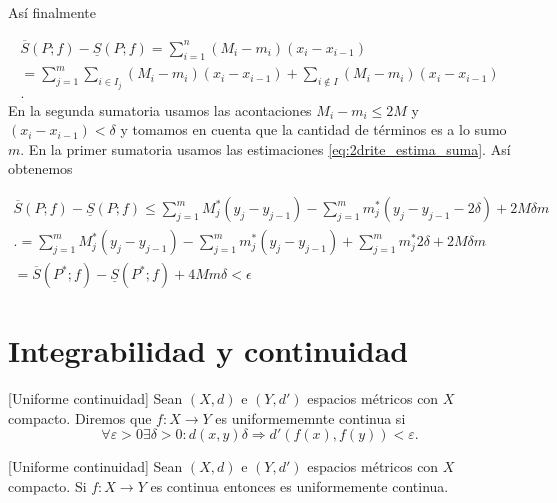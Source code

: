 \begin{demo}
Así finalmente

\begin{multline*}\label{eq:crite2_cuentas}
 \overline{S}(P;f)-\underline{S}(P;f)=\sum_{i=1}^n(M_i-m_i)(x_i-x_{i-1})\\
 =\sum_{j=1}^m \sum_{i\in I_j}(M_i-m_i)(x_i-x_{i-1})+ \sum_{i\notin I}(M_i-m_i)(x_i-x_{i-1})\\  .
\end{multline*}
En la segunda sumatoria usamos las acontaciones $M_i-m_i\leq 2M$ y $(x_i-x_{i-1})<\delta$ y tomamos en cuenta que la cantidad de términos es a lo sumo $m$. En la primer sumatoria usamos las estimaciones \eqref{eq:2drite_estima_suma}. Así obtenemos

\begin{multline*}\label{eq:crite2_cuentas}
 \overline{S}(P;f)-\underline{S}(P;f)
 \leq \sum_{j=1}^m  M^*_j(y_j-y_{j-1})-\sum_{j=1}^m  m^*_j(y_j-y_{j-1}-2\delta)+ 2M\delta m\\ 
 . =\sum_{j=1}^m  M^*_j(y_j-y_{j-1})-\sum_{j=1}^m  m^*_j(y_j-y_{j-1})+ \sum_{j=1}^m m^*_j 2\delta +2M\delta m\\ 
 = \overline{S}(P^*;f)-\underline{S}(P^*;f)+4Mm\delta<\epsilon
\end{multline*}
 
\end{demo}



\section{Integrabilidad y continuidad}


\begin{definicion}{}[Uniforme continuidad]  Sean $(X,d)$ e $(Y,d')$ espacios métricos con $X$ compacto. Diremos que $f:X\to Y$ es uniformememnte continua si 
\[
 \forall\varepsilon>0\exists \delta>0:d(x,y)\delta\Rightarrow d'(f(x),f(y))<\varepsilon.
\]

 
\end{definicion}

\begin{teorema}{}[Uniforme continuidad] 
 Sean $(X,d)$ e $(Y,d')$ espacios métricos con $X$ compacto. Si $f:X\to Y$ es continua entonces es uniformemente continua.

\end{teorema}

